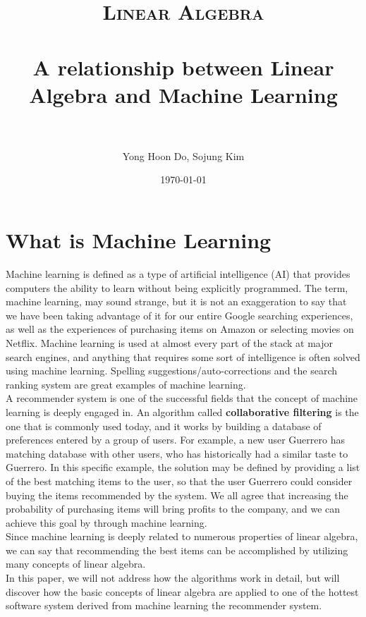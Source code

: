 \documentclass[paper=letter, fontsize=12pt]{scrartcl} %
\title{
\normalfont \normalsize
\textsc{Linear Algebra} \\ [25pt] %
\horrule{0.5pt} \\[0.4cm] %
\huge A relationship between Linear Algebra and Machine Learning \\
\horrule{2pt} \\[0.5cm] %
}
\author{Yong Hoon Do, Sojung Kim} %
\date{\normalsize\today} %
\numberwithin{equation}{section} %
\numberwithin{figure}{section} %
\numberwithin{table}{section} %
\begin{document}
\maketitle %

\section{What is Machine Learning}

Machine learning is defined as a type of artificial intelligence (AI) that
provides computers the ability to learn without being explicitly
programmed. The term, machine learning, may sound strange, but it is not an
exaggeration to say that we have been taking advantage of it for our entire
Google searching experiences, as well as the experiences of purchasing items on Amazon or selecting movies on Netflix. Machine learning is used at almost every part of the stack at major search engines, and anything that requires some sort of
intelligence is often solved using machine learning. Spelling suggestions/auto-corrections and the search ranking system are great examples of machine learning. \\

A recommender system is one of the successful fields that the concept of machine
learning is deeply engaged in. An algorithm called
\textbf{collaborative filtering} is the one that is commonly used today, and it works by building a database of preferences entered by a group of users. For example, a new user Guerrero has matching database with other users, who has historically had a similar taste to Guerrero.
In this specific example, the solution may be defined by providing
a list of the best matching items to the user, so that the user Guerrero could
consider buying the items recommended by the system.
We all agree that increasing the probability of purchasing items will bring
profits to the company, and we can achieve this goal by through machine learning. \\

Since machine learning is deeply related to numerous properties of linear algebra,
we can say that recommending the best items can be accomplished by
utilizing many concepts of linear algebra. \\

In this paper, we will not address how the algorithms work in detail,
but will discover how the basic concepts of linear algebra are
applied to one of the hottest software system derived from machine learning \textendash the recommender system.
\end{document}
